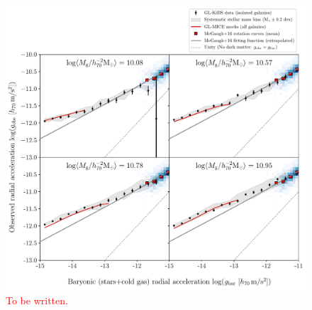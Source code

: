 \documentclass[usenatbib]{mnras}
\begin{document}

\begin{figure}
	\includegraphics[width=\textwidth]{Figures/RAR_KiDS+MICE_4-massbins_all.pdf}
	\caption{\textcolor{red}{To be written.}}
	\label{fig:RAR_kids_mice_mstarbins_all}
\end{figure}
\end{document}
